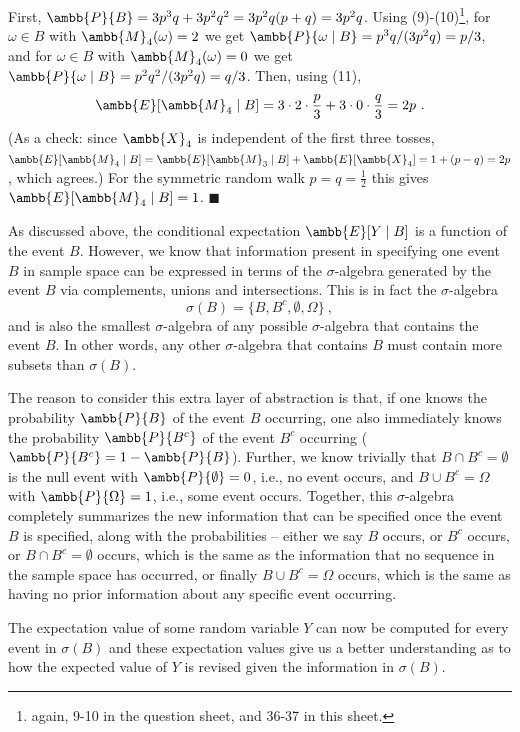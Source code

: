 \documentclass[12pt]{article} %
\newcommand{\mE}{\ambb{E}}
\newcommand{\mX}{\ambb{X}}
\newcommand{\mM}{\ambb{M}}
\newcommand{\mP}{\ambb{P}}
\begin{document}
First, $\mP\{B\} = 3p^3q + 3p^2q^2 = 3p^2q(p+q) = 3p^2q$. Using
(9)-(10)\footnote{again, 9-10 in the question sheet, and 36-37 in this sheet.}, for $\omega \in B$ with $\mM_4(\omega)=2$ we get
$\mP\{\omega\mid B\} = p^3q/(3p^2q) = p/3$, and for $\omega\in B$ with
$\mM_4(\omega)=0$ we get $\mP\{\omega \mid B\} = p^2q^2/(3p^2q) = q/3$.
Then, using (11),
\begin{equation}
  \mE[\mM_4\mid B] = 3\cdot 2 \cdot \frac{p}{3} + 3 \cdot 0 \cdot \frac{q}{3} = 2p\ .
\end{equation}
(As a check: since $\mX_4$ is independent of the first three tosses,
$\mE[\mM_4\mid B] = \mE[\mM_3\mid B] + \mE[\mX_4] = 1 + (p-q) = 2p$, which agrees.) For the symmetric random walk
$p=q=\tfrac12$ this gives $\mE[\mM_4\mid B] = 1$. \hfill$\blacksquare$

As discussed above, the conditional expectation $\mE[Y\mid B]$ is a
function of the event $B$. However, we know that information present
in specifying one event $B$ in sample space can be expressed in terms
of the $\sigma$-algebra generated by the event $B$ via complements,
unions and intersections. This is in fact the $\sigma$-algebra
\begin{equation}
  \sigma(B) = \{B, B^c, \emptyset, \Omega\}\ ,
\end{equation}
and is also the smallest $\sigma$-algebra of any possible
$\sigma$-algebra that contains the event $B$. In other words, any other
$\sigma$-algebra that contains $B$ must contain more subsets than
$\sigma(B)$.

The reason to consider this extra layer of abstraction is that, if one
knows the probability $\mP\{B\}$ of the event $B$ occurring, one also
immediately knows the probability $\mP\{B^c\}$ of the event $B^c$
occurring ($\mP\{B^c\} = 1-\mP\{B\}$). Further, we know trivially that
$B \cap B^c = \emptyset$ is the null event with $\mP\{\emptyset\} =
0$, i.e., no event occurs, and $B \cup B^c = \Omega$ with $\mP\{\Omega\}
= 1$, i.e., some event occurs. Together, this $\sigma$-algebra
completely summarizes the new information that can be specified once
the event $B$ is specified, along with the probabilities -- either we
say $B$ occurs, or $B^c$ occurs, or $B\cap B^c = \emptyset$ occurs,
which is the same as the information that no sequence in the sample
space has occurred, or finally $B \cup B^c = \Omega$ occurs, which is
the same as having no prior information about any specific event
occurring.

The expectation value of some random variable $Y$ can now be computed
for every event in $\sigma(B)$ and these expectation values give us a
better understanding as to how the expected value of $Y$ is revised
given the information in $\sigma(B)$.
\end{document}
